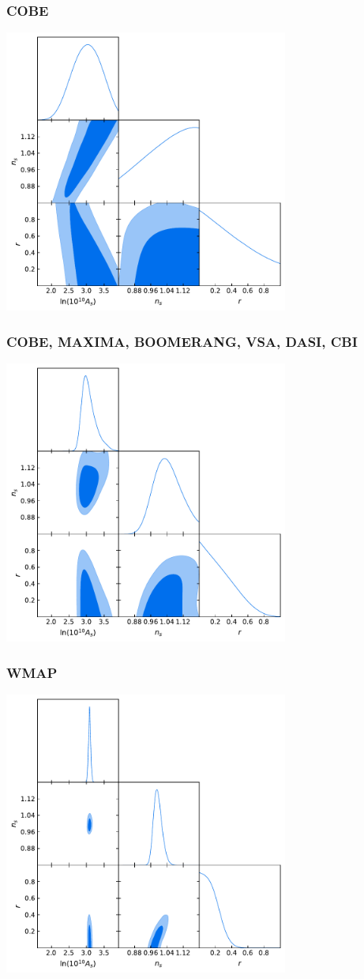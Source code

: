 \documentclass[%
]{beamer}
\begin{document}
\begin{frame}
    \frametitle{COBE}
    \centering
    \includegraphics[width=0.7\textwidth]{./figures/COBE.pdf}
\end{frame}
\begin{frame}
    \frametitle{COBE, MAXIMA, BOOMERANG, VSA, DASI, CBI}
    \centering
    \includegraphics[width=0.7\textwidth]{./figures/pre_WMAP.pdf}
\end{frame}
\begin{frame}
    \frametitle{WMAP}
    \centering
    \includegraphics[width=0.7\textwidth]{./figures/WMAP.pdf}
\end{frame}
\end{document}
